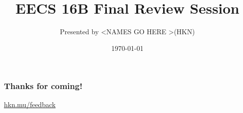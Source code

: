 

\title{EECS 16B Final Review Session}
\author{Presented by \textless NAMES GO HERE \textgreater (HKN)}
\date{\today}

\newcommand{\SlideAccessingLogistics}{@ \textgreater PIAZZA INFO GOES HERE \textless }




















\begin{frame}
    \frametitle{Thanks for coming!}
    \href{https://hkn.mu/feedback}{hkn.mu/feedback}
\end{frame}


